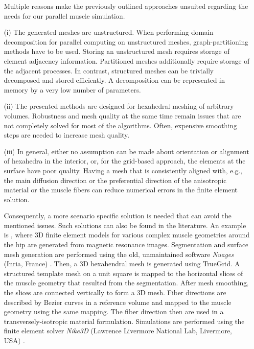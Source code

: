 \nocite{Gregson2011}

Multiple reasons make the previously outlined approaches unsuited regarding the needs for our parallel muscle simulation. 

(i) The generated meshes are unstructured. When performing domain decomposition for parallel computing on unstructured meshes, graph-partitioning methods have to be used. Storing an unstructured mesh requires storage of element adjacency information. Partitioned meshes additionally require storage of the adjacent processes. In contrast, structured meshes can be trivially decomposed and stored efficiently. A decomposition can be represented in memory by a very low number of parameters.

(ii) The presented methods are designed for hexahedral meshing of arbitrary volumes. Robustness and mesh quality at the same time remain issues that are not completely solved for most of the algorithms. Often, expensive smoothing steps are needed to increase mesh quality.

(iii) In general, either no assumption can be made about orientation or alignment of hexahedra in the interior, or, for the grid-based approach, the elements at the surface have poor quality. Having a mesh that is consistently aligned with, e.g., the main diffusion direction or the preferential direction of the anisotropic material or the muscle fibers can reduce numerical errors in the finite element solution.

Consequently, a more scenario specific solution is needed that can avoid the mentioned issues. Such solutions can also be found in the literature. An example is \cite{blemker2005three}, where 3D finite element models for various complex muscle geometries around the hip are generated from magnetic resonance images. Segmentation and surface mesh generation are performed using the old, unmaintained software \emph{Nuages} (Inria, France) \cite{Nuages}.
Then, a 3D hexahendral mesh is generated using TrueGrid. A structured template mesh on a unit square is mapped to the horizontal slices of the muscle geometry that resulted from the segmentation. After mesh smoothing, the slices are connected vertically to form a 3D mesh. 
Fiber directions are described by Bezier curves in a reference volume and mapped to the muscle geometry using the same mapping. The fiber direction then are used in a transversely-isotropic material formulation. Simulations are performed using the finite element solver \emph{Nike3D} (Lawrence Livermore National Lab, Livermore, USA) \cite{Nike3D}.

